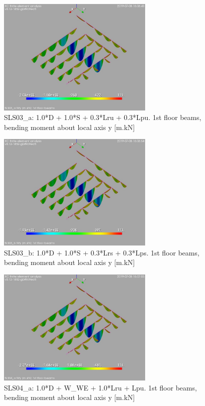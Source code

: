 \begin{figure}
\begin{center}
\includegraphics[width=75mm]{annex_res_columns/graphics/resSimplLC/SLS03_abeamsMy}
\caption{SLS03\_a: 1.0*D + 1.0*S + 0.3*Lru + 0.3*Lpu. 1st floor beams, bending moment about local axis y [m.kN]}
\end{center}
\end{figure}

\begin{figure}
\begin{center}
\includegraphics[width=75mm]{annex_res_columns/graphics/resSimplLC/SLS03_bbeamsMy}
\caption{SLS03\_b: 1.0*D + 1.0*S + 0.3*Lrs + 0.3*Lps. 1st floor beams, bending moment about local axis y [m.kN]}
\end{center}
\end{figure}

\begin{figure}
\begin{center}
\includegraphics[width=75mm]{annex_res_columns/graphics/resSimplLC/SLS04_abeamsMy}
\caption{SLS04\_a: 1.0*D + W\_WE + 1.0*Lru + Lpu. 1st floor beams, bending moment about local axis y [m.kN]}
\end{center}
\end{figure}

